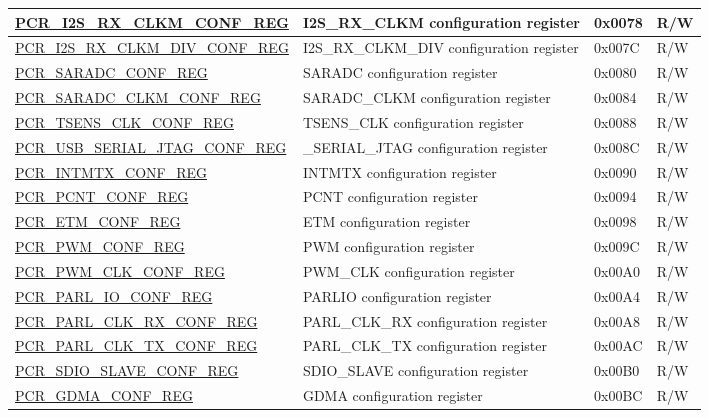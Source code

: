 \begin{longtable}{ | p{6cm} | p{7.2cm} | p{1.3cm} | p{1cm} | }
\hyperref[regdesc:PCRI2SRXCLKMCONFREG]{PCR\_I2S\_RX\_CLKM\_CONF\_REG} & I2S\_RX\_CLKM configuration register & 0x0078 & R/W \\ \hline
\hyperref[regdesc:PCRI2SRXCLKMDIVCONFREG]{PCR\_I2S\_RX\_CLKM\_DIV\_CONF\_REG} & I2S\_RX\_CLKM\_DIV configuration register & 0x007C & R/W \\ \hline
\hyperref[regdesc:PCRSARADCCONFREG]{PCR\_SARADC\_CONF\_REG} & SARADC configuration register & 0x0080 & R/W \\ \hline
\hyperref[regdesc:PCRSARADCCLKMCONFREG]{PCR\_SARADC\_CLKM\_CONF\_REG} & SARADC\_CLKM configuration register & 0x0084 & R/W \\ \hline
\hyperref[regdesc:PCRTSENSCLKCONFREG]{PCR\_TSENS\_CLK\_CONF\_REG} & TSENS\_CLK configuration register & 0x0088 & R/W \\ \hline
\hyperref[regdesc:PCRUSBDEVICECONFREG]{PCR\_USB\_SERIAL\_JTAG\_CONF\_REG} & \_SERIAL\_JTAG configuration register & 0x008C & R/W \\ \hline
\hyperref[regdesc:PCRINTMTXCONFREG]{PCR\_INTMTX\_CONF\_REG} & INTMTX configuration register & 0x0090 & R/W \\ \hline
\hyperref[regdesc:PCRPCNTCONFREG]{PCR\_PCNT\_CONF\_REG} & PCNT configuration register & 0x0094 & R/W \\ \hline
\hyperref[regdesc:PCRETMCONFREG]{PCR\_ETM\_CONF\_REG} & ETM configuration register & 0x0098 & R/W \\ \hline
\hyperref[regdesc:PCRPWMCONFREG]{PCR\_PWM\_CONF\_REG} & PWM configuration register & 0x009C & R/W \\ \hline
\hyperref[regdesc:PCRPWMCLKCONFREG]{PCR\_PWM\_CLK\_CONF\_REG} & PWM\_CLK configuration register & 0x00A0 & R/W \\ \hline
\hyperref[regdesc:PCRPARLIOCONFREG]{PCR\_PARL\_IO\_CONF\_REG} & PARLIO configuration register & 0x00A4 & R/W \\ \hline
\hyperref[regdesc:PCRPARLCLKRXCONFREG]{PCR\_PARL\_CLK\_RX\_CONF\_REG} & PARL\_CLK\_RX configuration register & 0x00A8 & R/W \\ \hline
\hyperref[regdesc:PCRPARLCLKTXCONFREG]{PCR\_PARL\_CLK\_TX\_CONF\_REG} & PARL\_CLK\_TX configuration register & 0x00AC & R/W \\ \hline
\hyperref[regdesc:PCRSDIOSLAVECONFREG]{PCR\_SDIO\_SLAVE\_CONF\_REG} & SDIO\_SLAVE configuration register & 0x00B0 & R/W \\ \hline
\hyperref[regdesc:PCRGDMACONFREG]{PCR\_GDMA\_CONF\_REG} & GDMA configuration register & 0x00BC & R/W \\ \hline

\end{longtable}
